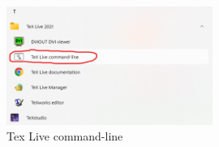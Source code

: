 \begin{figure}[htbp] 
	\centering
	\includegraphics[width=0.6\textwidth]{image/chap01/texlivecmd.png}
	\caption{Tex Live command-line}
	\label{fig:texlivecmd}
\end{figure}